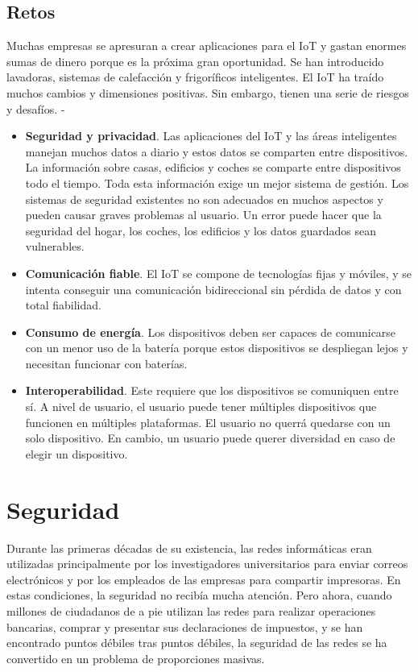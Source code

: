 {\subsection{Retos}

Muchas empresas se apresuran a crear aplicaciones para el IoT y gastan enormes sumas de dinero porque es la próxima gran oportunidad. Se han introducido lavadoras, sistemas de calefacción y frigoríficos inteligentes. El IoT ha traído muchos cambios y dimensiones positivas. Sin embargo, tienen una serie de riesgos y desafíos. \cite{8320780}-\cite{tripathy2017internet}

\begin{itemize}
    \item \textbf{Seguridad y privacidad}. Las aplicaciones del IoT y las áreas inteligentes manejan muchos datos a diario y estos datos se comparten entre dispositivos. La información sobre casas, edificios y coches se comparte entre dispositivos todo el tiempo. Toda esta información exige un mejor sistema de gestión. Los sistemas de seguridad existentes no son adecuados en muchos aspectos y pueden causar graves problemas al usuario. Un error puede hacer que la seguridad del hogar, los coches, los edificios y los datos guardados sean vulnerables.
    \item \textbf{Comunicación fiable}. El IoT se compone de tecnologías fijas y móviles, y se intenta conseguir una comunicación bidireccional sin pérdida de datos y con total fiabilidad.
    \item \textbf{Consumo de energía}. Los dispositivos deben ser capaces de comunicarse con un menor uso de la batería porque estos dispositivos se despliegan lejos y necesitan funcionar con baterías.
    \item \textbf{Interoperabilidad}. Este requiere que los dispositivos se comuniquen entre sí. A nivel de usuario, el usuario puede tener múltiples dispositivos que funcionen en múltiples plataformas. El usuario no querrá quedarse con un solo dispositivo. En cambio, un usuario puede querer diversidad en caso de elegir un dispositivo.
\end{itemize}


\section{Seguridad}

Durante las primeras décadas de su existencia, las redes informáticas eran utilizadas principalmente por los investigadores universitarios para enviar correos electrónicos y por los empleados de las empresas para compartir impresoras. En estas condiciones, la seguridad no recibía mucha atención. Pero ahora, cuando millones de ciudadanos de a pie utilizan las redes para realizar operaciones bancarias, comprar y presentar sus declaraciones de impuestos, y se han encontrado puntos débiles tras puntos débiles, la seguridad de las redes se ha convertido en un problema de proporciones masivas. \\ 

}
